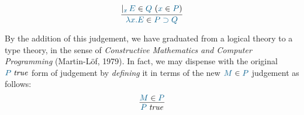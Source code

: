 %
\[
  \infer{
    \ver{\lambda x.E}{P\supset Q}
  }{
    \genj{x}{\hyp{\ver{E}{Q}}{\ver{x}{P}}}
  }
\]

By the addition of this judgement, we have graduated from a logical theory to a
type theory, in the sense of \emph{Constructive Mathematics and Computer
Programming} (Martin-L\"of, 1979). In fact, we may dispense with the original
$\istrue{P}$ form of judgement by \emph{defining} it in terms of the new
$\ver{M}{P}$ judgement as follows:
\[
  \infer{
    \istrue{P}
  }{
    \ver{M}{P}
  }
\]

